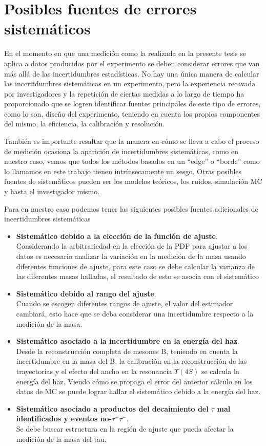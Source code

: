 \chapter{Posibles fuentes de errores sistemáticos}
En el momento en que una medición como la realizada en la presente tesis se aplica a datos producidos por el experimento se deben considerar errores que van más allá de las incertidumbres estadísticas. No hay una única manera de calcular las incertidumbres sistemáticas en un experimento, pero la experiencia recavada por investigadores y la repetición de ciertas medidas a lo largo de tiempo ha proporcionado que se logren identificar fuentes principales de este tipo de errores, como lo son, diseño del experimento, teniendo en cuenta los propios componentes del mismo, la eficiencia, la calibración y resolución.

También es importante resaltar que la manera en cómo se lleva a cabo el proceso de medición ocasiona la aparición de incertidumbres sistemáticas, como en nuestro caso, vemos que todos los métodos basados en un ``edge'' o ``borde'' como lo llamamos en este trabajo tienen intrínsecamente un sesgo. Otras posibles fuentes de sistemáticos pueden ser los modelos teóricos, los ruidos, simulación MC y hasta el investigador mismo.

Para en nuestro caso podemos tener las siguientes posibles fuentes adicionales de incertidumbres sistemáticas

\begin{itemize}
    \item \textbf{Sistemático debido a la elección de la función de ajuste}.\\
    Considerando la arbitrariedad en la elección de la PDF para ajustar a los datos es necesario analizar la variación en la medición de la masa usando diferentes funciones de ajuste, para este caso se debe calcular la varianza de las diferentes masas halladas, el resultado de esto se asocia con el sistemático
    \item \textbf{Sistemático debido al rango del ajuste}.\\
    Cuando  se escogen diferentes rangos de ajuste, el valor del estimador cambiará, esto hace que se deba considerar una incertidumbre respecto a la medición de la masa.
    \item \textbf{Sistemático asociado a la incertidumbre en la energía del haz}. \\
    Desde la reconstrucción completa de mesones B, teniendo en cuenta la incertidumbre en la masa del B, la calibración en la reconstrucción de las trayectorias y el efecto del ancho en la resonancia \(\Upsilon(4S)\) se calcula la energía del haz. Viendo cómo se propaga el error del anterior cálculo en los datos de MC se puede lograr hallar el sistemático debido a la energía del haz.
    \item \textbf{Sistemático asociado a productos del decaimiento del \(\tau\) mal identificados y eventos no-\(\tau^+\tau^-\)}.\\
    Se debe buscar estructura en la región de ajuste  que pueda afectar la medición de la masa del tau.   
    
\end{itemize}
